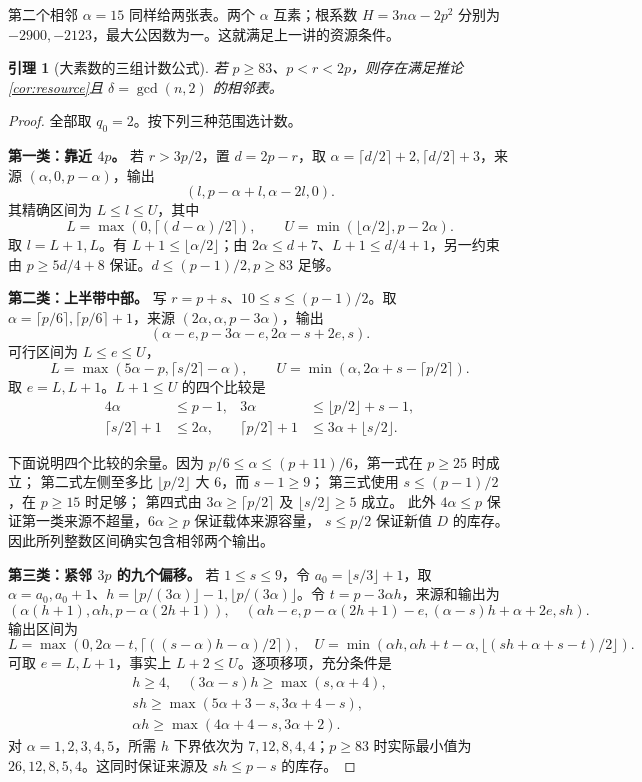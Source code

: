 \documentclass[11pt,a4paper,oneside,openany]{book}
\newtheorem{lemma}[theorem]{引理}
\theoremstyle{definition}
\numberwithin{equation}{chapter}
\begin{document}
第二个相邻 $\alpha=15$ 同样给两张表。两个 $\alpha$ 互素；根系数 $H=3n\alpha-2p^2$ 分别为 $-2900,-2123$，最大公因数为一。这就满足上一讲的资源条件。
\begin{lemma}[大素数的三组计数公式]\label{lem:upper-supply}
若 $p\ge83$、$p<r<2p$，则存在满足推论\ref{cor:resource}且 $\delta=\gcd(n,2)$ 的相邻表。
\end{lemma}
\begin{proof}
全部取 $q_0=2$。按下列三种范围选计数。

\par\noindent\textbf{第一类：靠近 $4p$。} 若 $r>3p/2$，置 $d=2p-r$，取 $\alpha=\lceil d/2\rceil+2,\lceil d/2\rceil+3$，来源 $(\alpha,0,p-\alpha)$，输出
\[(l,p-\alpha+l,\alpha-2l,0).
\]
其精确区间为 $L\le l\le U$，其中
\[L=\max(0,\lceil(d-\alpha)/2\rceil),\qquad
U=\min(\lfloor\alpha/2\rfloor,p-2\alpha).
\]
取 $l=L+1,L$。有 $L+1\le\lfloor\alpha/2\rfloor$；由 $2\alpha\le d+7$、$L+1\le d/4+1$，另一约束由 $p\ge5d/4+8$ 保证。$d\le(p-1)/2,p\ge83$ 足够。

\par\noindent\textbf{第二类：上半带中部。} 写 $r=p+s$、$10\le s\le(p-1)/2$。取 $\alpha=\lceil p/6\rceil,\lceil p/6\rceil+1$，来源 $(2\alpha,\alpha,p-3\alpha)$，输出
\[(\alpha-e,p-3\alpha-e,2\alpha-s+2e,s).
\]
可行区间为 $L\le e\le U$，
\[L=\max(5\alpha-p,\lceil s/2\rceil-\alpha),\qquad
U=\min(\alpha,2\alpha+s-\lceil p/2\rceil).
\]
取 $e=L,L+1$。$L+1\le U$ 的四个比较是
\begin{align*}
4\alpha&\le p-1,&3\alpha&\le\lfloor p/2\rfloor+s-1,\\
\lceil s/2\rceil+1&\le2\alpha,&\lceil p/2\rceil+1&\le3\alpha+\lfloor s/2\rfloor.
\end{align*}

下面说明四个比较的余量。因为 $p/6\le\alpha\le(p+11)/6$，第一式在 $p\ge25$ 时成立；
第二式左侧至多比 $\lfloor p/2\rfloor$ 大 $6$，而 $s-1\ge9$；
第三式使用 $s\le(p-1)/2$，在 $p\ge15$ 时足够；
第四式由 $3\alpha\ge\lceil p/2\rceil$ 及 $\lfloor s/2\rfloor\ge5$ 成立。
此外 $4\alpha\le p$ 保证第一类来源不超量，$6\alpha\ge p$ 保证载体来源容量，
$s\le p/2$ 保证新值 $D$ 的库存。因此所列整数区间确实包含相邻两个输出。

\par\noindent\textbf{第三类：紧邻 $3p$ 的九个偏移。} 若 $1\le s\le9$，令 $a_0=\lfloor s/3\rfloor+1$，取 $\alpha=a_0,a_0+1$、$h=\lfloor p/(3\alpha)\rfloor-1,\lfloor p/(3\alpha)\rfloor$。令 $t=p-3\alpha h$，来源和输出为
\[
(\alpha(h+1),\alpha h,p-\alpha(2h+1)),\quad
(\alpha h-e,p-\alpha(2h+1)-e,(\alpha-s)h+\alpha+2e,sh).
\]
输出区间为
\[
L=\max(0,2\alpha-t,\lceil((s-\alpha)h-\alpha)/2\rceil),\quad
U=\min(\alpha h,\alpha h+t-\alpha,\lfloor(sh+\alpha+s-t)/2\rfloor).
\]
可取 $e=L,L+1$，事实上 $L+2\le U$。逐项移项，充分条件是
\[
\begin{gathered}
h\ge4,\quad(3\alpha-s)h\ge\max(s,\alpha+4),\\
sh\ge\max(5\alpha+3-s,3\alpha+4-s),\\
\alpha h\ge\max(4\alpha+4-s,3\alpha+2).
\end{gathered}
\]
对 $\alpha=1,2,3,4,5$，所需 $h$ 下界依次为 $7,12,8,4,4$；$p\ge83$ 时实际最小值为 $26,12,8,5,4$。这同时保证来源及 $sh\le p-s$ 的库存。



\end{proof}
\end{document}
